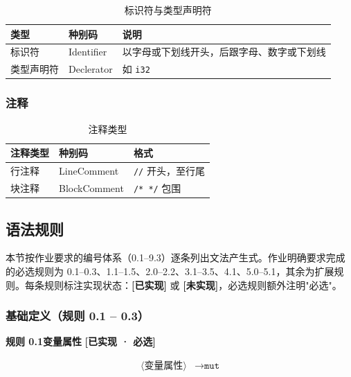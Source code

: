 \documentclass[12pt,a4paper]{ctexart}
\begin{document}
\begin{table}[H]
\centering
\caption{标识符与类型声明符}
\begin{tabular}{|l|l|l|}
\hline
\textbf{类型} & \textbf{种别码} & \textbf{说明} \\
\hline
标识符 & Identifier & 以字母或下划线开头，后跟字母、数字或下划线 \\
\hline
类型声明符 & Declerator & 如 \texttt{i32} \\
\hline
\end{tabular}
\end{table}

\subsubsection{注释}

\begin{table}[H]
\centering
\caption{注释类型}
\begin{tabular}{|l|l|l|}
\hline
\textbf{注释类型} & \textbf{种别码} & \textbf{格式} \\
\hline
行注释 & LineComment & \texttt{//} 开头，至行尾 \\
\hline
块注释 & BlockComment & \texttt{/* */} 包围 \\
\hline
\end{tabular}
\end{table}

\subsection{语法规则}

本节按作业要求的编号体系（0.1--9.3）逐条列出文法产生式。作业明确要求完成的必选规则为 0.1--0.3、1.1--1.5、2.0--2.2、3.1--3.5、4.1、5.0--5.1，其余为扩展规则。每条规则标注实现状态：\textcolor{green!60!black}{\textbf{[已实现]}} 或 \textcolor{red!70!black}{\textbf{[未实现]}}，必选规则额外注明"必选"。

\subsubsection{基础定义（规则 0.1 -- 0.3）}

\textbf{规则 0.1\quad 变量属性} \hfill \textcolor{green!60!black}{\textbf{[已实现 · 必选]}}

\begin{align}
\langle\text{变量属性}\rangle &\rightarrow \texttt{mut}
\end{align}
\end{document}
